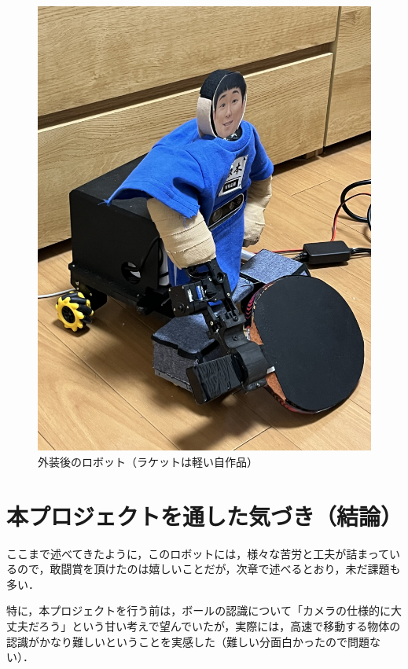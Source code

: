 \documentclass[10pt, oneside, titlepage]{ltjarticle}  %
\begin{document}
\begin{figure}[H]
\begin{minipage}{0.48\textwidth}
    \end{minipage}
    \hfill
    \begin{minipage}{0.48\textwidth}
      \centering
      \includegraphics[width=\textwidth]{figures/robot2.jpg}
      \caption{外装後のロボット（ラケットは軽い自作品）}
      \label{robot2}
    \end{minipage}
  \end{figure}
\section{本プロジェクトを通した気づき（結論）}
ここまで述べてきたように，このロボットには，様々な苦労と工夫が詰まっているので，敢闘賞を頂けたのは嬉しいことだが，次章で述べるとおり，未だ課題も多い．

特に，本プロジェクトを行う前は，ボールの認識について「カメラの仕様的に大丈夫だろう」という甘い考えで望んでいたが，実際には，高速で移動する物体の認識がかなり難しいということを実感した（難しい分面白かったので問題ない）．
\end{document}
